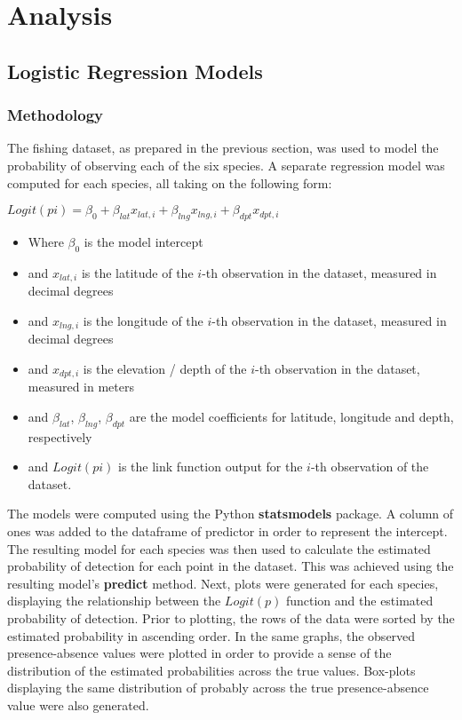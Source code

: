 \section{Analysis}

\subsection{Logistic Regression Models}

\subsubsection{Methodology}

The fishing dataset, as prepared in the previous section, was used to model the probability of observing each of the six species.
A separate regression model was computed for each species, all taking on the following form:\linebreak

\tabto{2cm} ${Logit}(pi) = \beta_0 + \beta_{lat} x_{lat,i} + \beta_{lng} x_{lng,i} + \beta_{dpt} x_{dpt,i}$

\begin{itemize}
    \item Where $\beta_{0}$ is the model intercept
    \item and $x_{lat, i}$ is the latitude of the $i$-th observation in the dataset, measured in decimal degrees
    \item and $x_{lng, i}$ is the longitude of the $i$-th observation in the dataset, measured in decimal degrees
    \item and $x_{dpt, i}$ is the elevation / depth of the $i$-th observation in the dataset, measured in meters
    \item and $\beta_{lat}$, $\beta_{lng}$, $\beta_{dpt}$ are the model coefficients for latitude, longitude and depth, respectively
    \item and ${Logit}(pi)$ is the link function output for the $i$-th observation of the dataset.
\end{itemize}

The models were computed using the Python \textbf{statsmodels} package.
A column of ones was added to the dataframe of predictor in order to represent the intercept.
The resulting model for each species was then used to calculate the estimated probability of detection for each point in the dataset.
This was achieved using the resulting model's \textbf{predict} method.
Next, plots were generated for each species, displaying the relationship between the $Logit(p)$ function and the estimated probability of detection.
Prior to plotting, the rows of the data were sorted by the estimated probability in ascending order.
In the same graphs, the observed presence-absence values were plotted in order to provide a sense of the distribution
of the estimated probabilities across the true values.
Box-plots displaying the same distribution of probably across the true presence-absence value were also generated.

